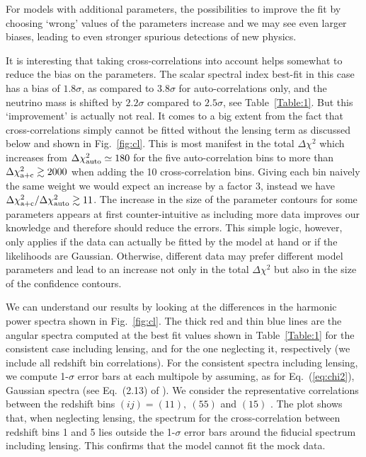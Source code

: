 For models with additional parameters, the possibilities to improve the fit by choosing `wrong' values of the parameters increase and we may see even larger biases, leading to even stronger spurious detections of new physics.

It is interesting that taking cross-correlations into account helps somewhat to reduce the bias on the parameters. The scalar spectral index best-fit in this case has a bias of $1.8\sigma$,  as compared to $3.8\sigma$ for auto-correlations only, and the neutrino mass is shifted by $2.2 \sigma$ compared to $2.5\sigma$,
see Table~\ref{Table:1}. But this `improvement' is actually not real. It comes to a big extent from the fact that cross-correlations simply cannot be fitted without the lensing term as discussed below and shown in Fig.\ \ref{fig:cl}.  This is most manifest in the  total $\Delta \chi^2$ which increases from $\Delta \chi_{\rm auto}^2\simeq 180$ for the five auto-correlation bins to more than $\Delta \chi_{\rm a+c}^2\gtrsim2000$ when adding the 10 cross-correlation bins. Giving each bin naively the same weight we would expect an increase by a factor 3, instead we have
$\Delta \chi_{\rm a+c}^2/\Delta \chi_{\rm auto}^2\gtrsim 11$.
The increase in the size of the parameter contours for some parameters appears at first counter-intuitive as including more data improves our knowledge and therefore should reduce the errors.
This simple logic, however, only applies if the data can actually be fitted by the model at hand or if the likelihoods are Gaussian. Otherwise, different data may prefer different model parameters and lead to an increase not only in the total $\Delta \chi^2$ but also in the size of the confidence contours.

We can understand our results by looking at the differences in the harmonic power spectra shown in Fig.\ \ref{fig:cl}.
The thick red and thin blue lines are the angular spectra computed at the best fit values shown in Table~\ref{Table:1} for the consistent case including lensing, and for the one neglecting it, respectively (we include all redshift bin correlations).
For the consistent spectra including lensing, we compute 1-$\sigma$ error bars at each multipole by assuming, as for Eq.~(\ref{eq:chi2}), Gaussian spectra (see Eq.~(2.13) of \cite{Montanari:2015rga}).
We consider the representative correlations between the redshift bins $(ij)=(11), ~(55)$ and $(15)$ .
The plot shows that, when neglecting lensing, the spectrum for the cross-correlation between redshift bins 1 and 5 lies outside the 1-$\sigma$ error bars around the fiducial spectrum including lensing. This confirms that the model cannot fit the mock data.

